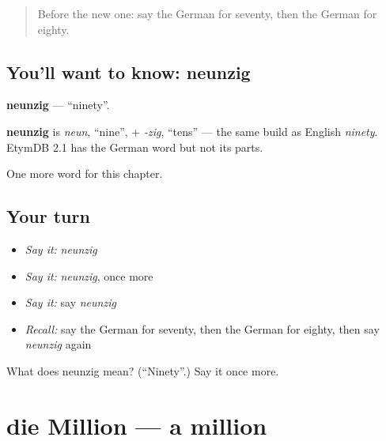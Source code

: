 \label{lesson:GE-C138-neunzig}



\begin{quote}
Before the new one: say the German for seventy, then the German for eighty.
\end{quote}

\subsection*{You'll want to know: neunzig}
\textbf{neunzig} — \textquotedblleft{}ninety\textquotedblright{}.

\begin{cousinweb}
\textbf{neunzig} is \emph{neun}, \textquotedblleft{}nine\textquotedblright{}, + \emph{-zig}, \textquotedblleft{}tens\textquotedblright{} — the same build as English \emph{ninety}. EtymDB 2.1 has the German word but not its parts.
\end{cousinweb}

\begin{grammarlens}[title={What you've built}]
One more word for this chapter.
\end{grammarlens}

\subsection*{Your turn}
\begin{itemize}
\raggedright
  \item \emph{Say it:} \emph{neunzig}
  \item \emph{Say it:} \emph{neunzig}, once more
  \item \emph{Say it:} say \emph{neunzig}
  \item \emph{Recall:} say the German for seventy, then the German for eighty, then say \emph{neunzig} again
\end{itemize}

\begin{tcolorbox}[breakable,colback=teal!4,colframe=teal!35!black,title={Before you move on}]
What does neunzig mean? (\textquotedblleft{}Ninety\textquotedblright{}.) Say it once more.
\end{tcolorbox}
\section[die Million]{die Million — a million}

\label{lesson:GE-C138-million}



